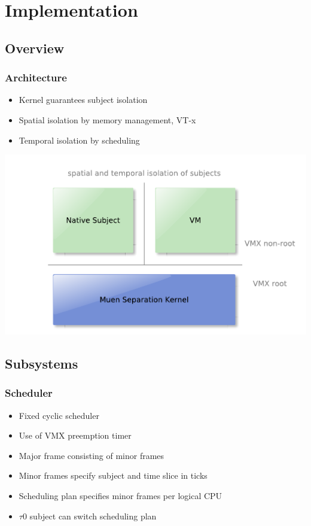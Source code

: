 \documentclass[xcolor={dvipsnames}]{beamer}
\begin{document}
\section{Implementation}
\subsection{Overview}
\begin{frame}\frametitle{Architecture}
\begin{itemize}
	\item Kernel guarantees subject isolation
	\item Spatial isolation by memory management, VT-x
	\item Temporal isolation by scheduling
\end{itemize}
\begin{center}
	\includegraphics[scale=0.5]{images/architecture-overview.pdf}
\end{center}
\end{frame}

\subsection{Subsystems}
\begin{frame}\frametitle{Scheduler}
\begin{itemize}
	\item Fixed cyclic scheduler
	\item Use of VMX preemption timer
	\item Major frame consisting of minor frames
	\item Minor frames specify subject and time slice in ticks
	\item Scheduling plan specifies minor frames per logical CPU
	\item $\tau$0 subject can switch scheduling plan
\end{itemize}

\end{frame}
\end{document}
